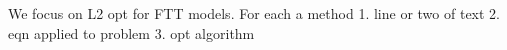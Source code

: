 \documentclass[11pt]{article}
\begin{document}
We focus on L2 opt for FTT models. For each a method 1. line or two of text 2. eqn applied to problem 3. opt algorithm
\end{document}
